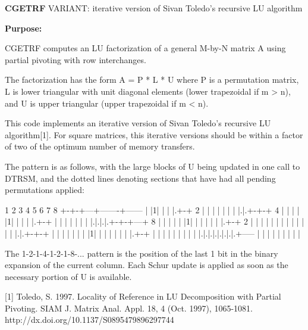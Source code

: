 {\bfseries C\+G\+E\+T\+R\+F} V\+A\+R\+I\+A\+N\+T\+: iterative version of Sivan Toledo's recursive L\+U algorithm 

{\bfseries Purpose\+:} \begin{DoxyVerb} CGETRF computes an LU factorization of a general M-by-N matrix A
 using partial pivoting with row interchanges.

 The factorization has the form
    A = P * L * U
 where P is a permutation matrix, L is lower triangular with unit
 diagonal elements (lower trapezoidal if m > n), and U is upper
 triangular (upper trapezoidal if m < n).

 This code implements an iterative version of Sivan Toledo's recursive
 LU algorithm[1].  For square matrices, this iterative versions should
 be within a factor of two of the optimum number of memory transfers.

 The pattern is as follows, with the large blocks of U being updated
 in one call to DTRSM, and the dotted lines denoting sections that
 have had all pending permutations applied:

  1 2 3 4 5 6 7 8
 +-+-+---+-------+------
 | |1|   |       |
 |.+-+ 2 |       |
 | | |   |       |
 |.|.+-+-+   4   |
 | | | |1|       |
 | | |.+-+       |
 | | | | |       |
 |.|.|.|.+-+-+---+  8
 | | | | | |1|   |
 | | | | |.+-+ 2 |
 | | | | | | |   |
 | | | | |.|.+-+-+
 | | | | | | | |1|
 | | | | | | |.+-+
 | | | | | | | | |
 |.|.|.|.|.|.|.|.+-----
 | | | | | | | | |

 The 1-2-1-4-1-2-1-8-... pattern is the position of the last 1 bit in
 the binary expansion of the current column.  Each Schur update is
 applied as soon as the necessary portion of U is available.

 [1] Toledo, S. 1997. Locality of Reference in LU Decomposition with
 Partial Pivoting. SIAM J. Matrix Anal. Appl. 18, 4 (Oct. 1997),
 1065-1081. http://dx.doi.org/10.1137/S0895479896297744\end{DoxyVerb}
 

